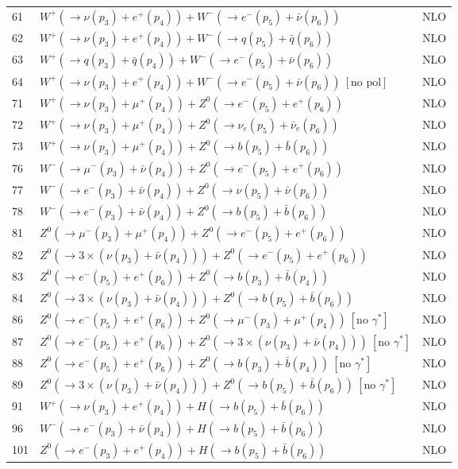 \documentclass[12pt]{article}
\begin{document}
\begin{itemize}
\begin{table}
\begin{center}
\begin{tabular}{|l|l|l|}
61& $ W^+(\to \nu(p_3)+e^+(p_4)) +W^-(\to e^-(p_5)+\bar{\nu}(p_6)) $ & NLO \\
62& $ W^+(\to \nu(p_3)+e^+(p_4)) +W^-(\to q(p_5)+\bar{q}(p_6)) $ & NLO \\
63& $ W^+(\to  q(p_3)+ \bar{q}(p_4)) +W^-(\to e^-(p_5)+\bar{\nu}(p_6)) $ & NLO \\
64& $ W^+(\to \nu(p_3)+e^+(p_4)) +W^-(\to e^-(p_5)+\bar{\nu}(p_6)) ~[ \mbox{no pol} ] $ & NLO \\
\hline 
71& $ W^+(\to \nu(p_3)+\mu^+(p_4))+Z^0(\to e^-(p_5)+e^+(p_6)) $ & NLO \\
72& $ W^+(\to \nu(p_3)+\mu^+(p_4))+Z^0(\to \nu_e(p_5)+\bar{\nu}_e(p_6)) $ & NLO \\
73& $ W^+(\to \nu(p_3)+\mu^+(p_4))+Z^0(\to b(p_5)+\bar{b}(p_6)) $ & NLO \\
\hline 
76& $ W^-(\to \mu^-(p_3)+\bar{\nu}(p_4))+Z^0(\to e^-(p_5)+e^+(p_6)) $ & NLO \\
77& $ W^-(\to e^-(p_3)+\bar{\nu}(p_4))+Z^0(\to \nu(p_5)+\bar{\nu}(p_6)) $ & NLO \\
78& $ W^-(\to e^-(p_3)+\bar{\nu}(p_4))+Z^0(\to b(p_5)+\bar{b}(p_6)) $ & NLO \\
\hline 
81& $ Z^0(\to \mu^-(p_3)+\mu^+(p_4)) + Z^0(\to e^-(p_5)+e^+(p_6)) $ & NLO \\
82& $ Z^0(\to 3\times(\nu(p_3)+\bar{\nu}(p_4))) + Z^0(\to e^-(p_5)+e^+(p_6)) $ & NLO \\
83& $ Z^0(\to e^-(p_5)+e^+(p_6)) + Z^0(\to b(p_3)+\bar{b}(p_4)) $ & NLO \\
84& $ Z^0(\to 3\times(\nu(p_3)+\bar{\nu}(p_4))) + Z^0(\to b(p_5)+\bar{b}(p_6)) $ & NLO \\
\hline 
86& $ Z^0(\to e^-(p_5)+e^+(p_6))+Z^0(\to \mu^-(p_3)+\mu^+(p_4)) ~[ \mbox{no $\gamma^*$} ] $ & NLO \\
87& $ Z^0(\to e^-(p_5)+e^+(p_6))+Z^0(\to 3\times(\nu(p_3)+\bar{\nu}(p_4))) ~[ \mbox{no $\gamma^*$} ] $ & NLO \\
88& $ Z^0(\to e^-(p_5)+e^+(p_6))+Z^0(\to b(p_3)+\bar{b}(p_4)) ~[ \mbox{no $\gamma^*$} ] $ & NLO \\
89& $ Z^0(\to 3\times(\nu(p_3)+\bar{\nu}(p_4))) + Z^0(\to b(p_5)+\bar{b}(p_6))~[ \mbox{no $\gamma^*$} ] $ & NLO \\
\hline 
91& $ W^+(\to \nu(p_3)+e^+(p_4)) + H(\to b(p_5)+\bar{b}(p_6))  $ & NLO \\
96& $ W^-(\to e^-(p_3)+\bar{\nu}(p_4)) + H(\to b(p_5)+\bar{b}(p_6)) $ & NLO \\ 
\hline 
101& $ Z^0(\to e^-(p_3)+e^+(p_4)) + H(\to b(p_5)+\bar{b}(p_6)) $ & NLO \\

\end{tabular}
\end{center}
\end{table}
\end{itemize}
\end{document}
